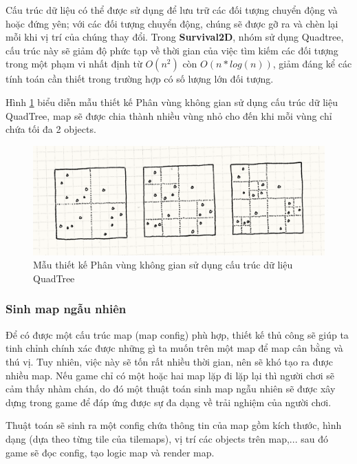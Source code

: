 \documentclass[12pt,a4paper]{article}
\begin{document}
   Cấu trúc dữ liệu có thể được sử dụng để lưu trữ các đối tượng chuyển động và hoặc đứng yên; với các đối tượng chuyển động, chúng sẽ được gỡ ra và chèn lại mỗi khi vị trí của chúng thay đổi. Trong \textbf{Survival2D}, nhóm sử dụng Quadtree, cấu trúc này sẽ giảm độ phức tạp về thời gian của việc tìm kiếm các đối tượng trong một phạm vi nhất định từ $O(n^2)$ còn $O(n*log(n))$, giảm đáng kể các tính toán cần thiết trong trường hợp có số lượng lớn đối tượng.

   Hình \ref{spatial_pattern_quadtree} biểu diễn mẫu thiết kế Phân vùng không gian sử dụng cấu trúc dữ liệu QuadTree, map sẽ được chia thành nhiều vùng nhỏ cho đến khi mỗi vùng chỉ chứa tối đa 2 objects.

   \begin{figure}[H]
      \centering
      \includegraphics[width=\textwidth]{Img/map/spatial-partition-quadtree.png}
      \caption{Mẫu thiết kế Phân vùng không gian sử dụng cấu trúc dữ liệu QuadTree\protect\footnotemark}
      \label{spatial_pattern_quadtree}
  \end{figure}
  
  \subsubsection{Sinh map ngẫu nhiên}
  Để có được một cấu trúc map (map config) phù hợp, thiết kế thủ công sẽ giúp ta tinh chỉnh chính xác được những gì ta muốn trên một map để map cân bằng và thú vị. Tuy nhiên, việc này sẽ tốn rất nhiều thời gian, nên sẽ khó tạo ra được nhiều map. Nếu game chỉ có một hoặc hai map lặp đi lặp lại thì người chơi sẽ cảm thấy nhàm chán, do đó một thuật toán sinh map ngẫu nhiên sẽ được xây dựng trong game để đáp ứng được sự đa dạng về trải nghiệm của người chơi.
  
  Thuật toán sẽ sinh ra một config chứa thông tin của map gồm kích thước, hình dạng (dựa theo từng tile của tilemaps), vị trí các objects trên map,... sau đó game sẽ đọc config, tạo logic map và render map.
\end{document}
